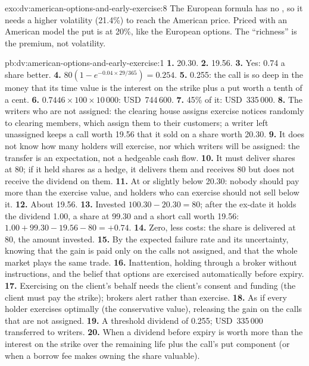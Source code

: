 \begin{solution}{exo:dv:american-options-and-early-exercise:8}
The European formula has no , so it needs a higher volatility
(21.4\%) to reach the American price. Priced with an American model the put is at 20\%,
like the European options. The ``richness'' is the premium, not volatility.
\end{solution}

\begin{solution}{pb:dv:american-options-and-early-exercise:1}
\textbf{1.} 20.30.
\textbf{2.} 19.56.
\textbf{3.} Yes: 0.74 a share better.
\textbf{4.} $80(1-e^{-0.04\times29/365})=0.254$.
\textbf{5.} 0.255: the call is so deep in the money that its time value is the interest on
the strike plus a put worth a tenth of a cent.
\textbf{6.} $0.7446\times100\times10\,000$: USD~744\,600.
\textbf{7.} 45\% of it: USD~335\,000.
\textbf{8.} The writers who are not assigned: the clearing house assigns exercise notices
randomly to clearing members, which assign them to their customers; a writer left
unassigned keeps a call worth 19.56 that it sold on a share worth 20.30.
\textbf{9.} It does not know how many holders will exercise, nor which writers will be
assigned: the transfer is an expectation, not a hedgeable cash flow.
\textbf{10.} It must deliver shares at 80; if it held shares as a hedge, it delivers them
and receives 80 but does not receive the dividend on them.
\textbf{11.} At or slightly below 20.30: nobody should pay more than the exercise value, and
holders who can exercise should not sell below it.
\textbf{12.} About 19.56.
\textbf{13.} Invested $100.30-20.30=80$; after the ex-date it holds the dividend 1.00, a
share at 99.30 and a short call worth 19.56: $1.00+99.30-19.56-80=+0.74$.
\textbf{14.} Zero, less costs: the share is delivered at 80, the amount invested.
\textbf{15.} By the expected failure rate and its uncertainty, knowing that the gain is paid
only on the calls not assigned, and that the whole market plays the same trade.
\textbf{16.} Inattention, holding through a broker without instructions, and the belief that
options are exercised automatically before expiry.
\textbf{17.} Exercising on the client's behalf needs the client's consent and funding (the
client must pay the strike); brokers alert rather than exercise.
\textbf{18.} As if every holder exercises optimally (the conservative value), releasing the gain
on the calls that are not assigned.
\textbf{19.} A threshold dividend of 0.255; USD~335\,000 transferred to writers.
\textbf{20.} When a dividend before expiry is worth more than the interest on the strike over
the remaining life plus the call's put component (or when a borrow fee makes owning the
share valuable).
\end{solution}

